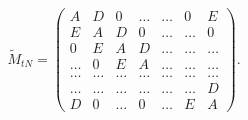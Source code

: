 \begin{equation}
\tilde{M}_{tN} =
 \begin{pmatrix}
 A     & D     & 0     & \dots & \dots & 0     & E     \\
 E     & A     & D     & 0     & \dots & \dots & 0     \\
 0     & E     & A     & D     & \dots & \dots & \dots \\
 \dots & 0     & E     & A     & \dots &  \dots & \dots \\
 \dots & \dots & \dots & \dots & \dots & \dots & \dots \\
 \dots & \dots & \dots & \dots & \dots & \dots & D     \\
  D    & 0     & \dots & 0     & \dots & E     & A
 \end{pmatrix}.
\end{equation}

